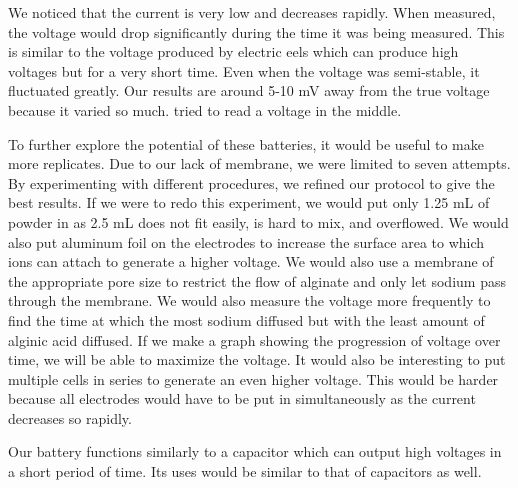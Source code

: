 \documentclass[letterpaper]{article}
\begin{document}
We noticed that the current is very low and decreases rapidly. When measured, 
the voltage would drop significantly during the time it was being measured. This is 
similar to the voltage produced by electric eels which can produce high voltages but 
for a very short time. Even when the voltage was semi-stable, it fluctuated greatly. 
Our results are around 5-10 mV away from the true voltage because it varied so much. 
 tried to read a voltage in the middle. 

To further explore the potential of these batteries, it would be useful to make more 
replicates. Due to our lack of membrane, we were limited to seven attempts. By experimenting 
with different procedures, we refined our protocol to give the best results. If we were to 
redo this experiment, we would put only 1.25 mL of powder in as 2.5 mL does not fit easily, 
is hard to mix, and overflowed. We would also put aluminum foil on the electrodes to increase 
the surface area to which ions can attach to generate a higher voltage. We would also use a 
membrane of the appropriate pore size to restrict the flow of alginate and only let sodium pass 
through the membrane. We would also measure the voltage more frequently to find the time at which 
the most sodium diffused but with the least amount of alginic acid diffused. If we make a graph 
showing the progression of voltage over time, we will be able to maximize the voltage. It would 
also be interesting to put multiple cells in series to generate an even higher voltage. This would 
be harder because all electrodes would have to be put in simultaneously as the current decreases 
so rapidly. 

Our battery functions similarly to a capacitor which can output high voltages 
in a short period of time. Its uses would be similar to that of capacitors as well.


\printbibliography[heading=bibintoc]
\end{document}
